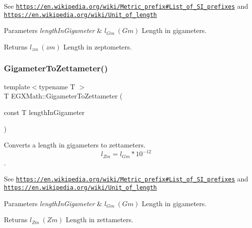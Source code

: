 See \href{https://en.wikipedia.org/wiki/Metric_prefix#List_of_SI_prefixes}{\tt https\+://en.\+wikipedia.\+org/wiki/\+Metric\+\_\+prefix\#\+List\+\_\+of\+\_\+\+S\+I\+\_\+prefixes} and \href{https://en.wikipedia.org/wiki/Unit_of_length}{\tt https\+://en.\+wikipedia.\+org/wiki/\+Unit\+\_\+of\+\_\+length} 
\begin{DoxyParams}{Parameters}
{\em length\+In\+Gigameter} & $ l_{Gm}\ (Gm)$ Length in gigameters. \\
\hline
\end{DoxyParams}
\begin{DoxyReturn}{Returns}
$ l_{zm}\ (zm)$ Length in zeptometers. 
\end{DoxyReturn}
\mbox{\label{group___e_g_x_math-_conversions-_length_conversions-_gigameter-_s_i_gaaaefaf67b876bfdeccd8176508e765e3}} 
\subsubsection{\texorpdfstring{Gigameter\+To\+Zettameter()}{GigameterToZettameter()}}
{\footnotesize\ttfamily template$<$typename T $>$ \\
T E\+G\+X\+Math\+::\+Gigameter\+To\+Zettameter (\begin{DoxyParamCaption}\item[{const T}]{length\+In\+Gigameter }\end{DoxyParamCaption})}



Converts a length in gigameters to zettameters. \[ l_{Zm}=l_{Gm} * 10^{-12} \]. 

See \href{https://en.wikipedia.org/wiki/Metric_prefix#List_of_SI_prefixes}{\tt https\+://en.\+wikipedia.\+org/wiki/\+Metric\+\_\+prefix\#\+List\+\_\+of\+\_\+\+S\+I\+\_\+prefixes} and \href{https://en.wikipedia.org/wiki/Unit_of_length}{\tt https\+://en.\+wikipedia.\+org/wiki/\+Unit\+\_\+of\+\_\+length} 
\begin{DoxyParams}{Parameters}
{\em length\+In\+Gigameter} & $ l_{Gm}\ (Gm)$ Length in gigameters. \\
\hline
\end{DoxyParams}
\begin{DoxyReturn}{Returns}
$ l_{Zm}\ (Zm)$ Length in zettameters. 
\end{DoxyReturn}
